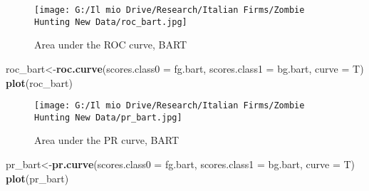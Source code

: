 \documentclass[]{article}
\newenvironment{Shaded}{\begin{snugshade}}{\end{snugshade}}
\newcommand{\CommentTok}[1]{\textcolor[rgb]{0.56,0.35,0.01}{\textit{#1}}}
\newcommand{\DataTypeTok}[1]{\textcolor[rgb]{0.13,0.29,0.53}{#1}}
\newcommand{\DecValTok}[1]{\textcolor[rgb]{0.00,0.00,0.81}{#1}}
\newcommand{\FloatTok}[1]{\textcolor[rgb]{0.00,0.00,0.81}{#1}}
\newcommand{\KeywordTok}[1]{\textcolor[rgb]{0.13,0.29,0.53}{\textbf{#1}}}
\newcommand{\NormalTok}[1]{#1}
\newcommand{\OperatorTok}[1]{\textcolor[rgb]{0.81,0.36,0.00}{\textbf{#1}}}
\newcommand{\StringTok}[1]{\textcolor[rgb]{0.31,0.60,0.02}{#1}}
\begin{document}
\begin{figure}
\centering
\texttt{[image: G:/Il mio Drive/Research/Italian Firms/Zombie Hunting New Data/roc\_bart.jpg]}
\caption{Area under the ROC curve, BART}
\end{figure}

\begin{Shaded}
\begin{Highlighting}[]
\NormalTok{roc_bart<-}\KeywordTok{roc.curve}\NormalTok{(}\DataTypeTok{scores.class0 =}\NormalTok{ fg.bart,}
                    \DataTypeTok{scores.class1 =}\NormalTok{ bg.bart,}
                    \DataTypeTok{curve =}\NormalTok{ T)}
\KeywordTok{plot}\NormalTok{(roc_bart)}
\end{Highlighting}
\end{Shaded}

\begin{figure}
\centering
\texttt{[image: G:/Il mio Drive/Research/Italian Firms/Zombie Hunting New Data/pr\_bart.jpg]}
\caption{Area under the PR curve, BART}
\end{figure}

\begin{Shaded}
\begin{Highlighting}[]
\NormalTok{pr_bart<-}\KeywordTok{pr.curve}\NormalTok{(}\DataTypeTok{scores.class0 =}\NormalTok{ fg.bart,}
                  \DataTypeTok{scores.class1 =}\NormalTok{ bg.bart,}
                  \DataTypeTok{curve =}\NormalTok{ T)}
\KeywordTok{plot}\NormalTok{(pr_bart)}
\end{Highlighting}
\end{Shaded}

\begin{Shaded}
\end{Shaded}

\begin{Shaded}
\end{Shaded}
\end{document}
